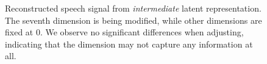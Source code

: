 \begin{figure}
	\centering
	\begin{subfigure}{0.34\textwidth}
		\centering
		
	\end{subfigure}\hfill
	\begin{subfigure}{0.3\textwidth}
		\centering
		
	\end{subfigure}\hfill
	\begin{subfigure}{0.3\textwidth}
		\centering
		
	\end{subfigure}
	
	\vspace{0.5cm} %
	
	\begin{subfigure}{0.36\textwidth}
		\centering
		
	\end{subfigure}\hfill
	\begin{subfigure}{0.3\textwidth}
		\centering
		
	\end{subfigure}\hfill
	\begin{subfigure}{0.3\textwidth}
		\centering
		
	\end{subfigure}
	
	\caption{Reconstructed speech signal from \textit{intermediate} latent representation. The seventh dimension is being modified, while other dimensions are fixed at 0. We observe no significant differences when adjusting, indicating that the dimension may not capture any information at all.}
	\label{fig:interpol_dim7}
\end{figure}


